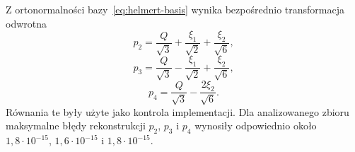 \documentclass[12pt,letterpaper,oneside]{report}
\numberwithin{equation}{chapter}
\numberwithin{figure}{chapter}
\numberwithin{table}{chapter}
\begin{document}
Z ortonormalności bazy~\eqref{eq:helmert-basis} wynika bezpośrednio transformacja odwrotna
\begin{equation}
p_2=\frac{Q}{\sqrt3}+\frac{\xi_1}{\sqrt2}+\frac{\xi_2}{\sqrt6},
\end{equation}
\begin{equation}
p_3=\frac{Q}{\sqrt3}-\frac{\xi_1}{\sqrt2}+\frac{\xi_2}{\sqrt6},
\end{equation}
\begin{equation}
p_4=\frac{Q}{\sqrt3}-\frac{2\xi_2}{\sqrt6}.
\end{equation}
Równania te były użyte jako kontrola implementacji. Dla analizowanego zbioru maksymalne błędy rekonstrukcji $p_2$, $p_3$ i $p_4$ wynosiły odpowiednio około $1{,}8\cdot10^{-15}$, $1{,}6\cdot10^{-15}$ i $1{,}8\cdot10^{-15}$.



\end{document}
